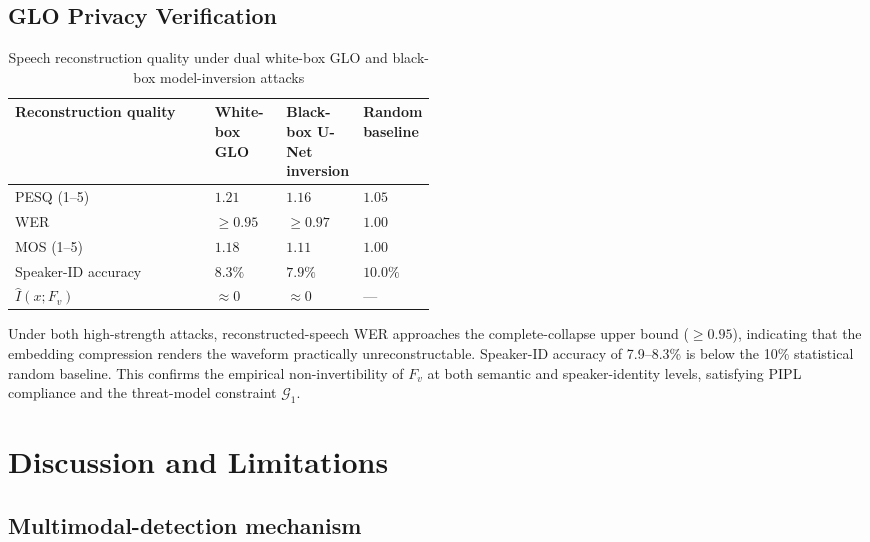 \documentclass[11pt, a4paper]{article}
\begin{document}
\subsection{GLO Privacy Verification}

\begin{table}[htbp]
\centering
\caption{Speech reconstruction quality under dual white-box GLO and black-box model-inversion attacks}
\label{tab:privacy_attack-en}
\small
\renewcommand{\arraystretch}{1.25}
\begin{tabular}{l>{\centering\arraybackslash}p{0.17\linewidth}>{\centering\arraybackslash}p{0.16\linewidth}>{\centering\arraybackslash}p{0.16\linewidth}}
\toprule
\textbf{Reconstruction quality} & \textbf{White-box GLO} & \textbf{Black-box U-Net inversion} & \textbf{Random baseline} \\
\midrule
PESQ (1--5) & $1.21$ & $1.16$ & $1.05$ \\
WER & $\ge 0.95$ & $\ge 0.97$ & $1.00$ \\
MOS (1--5) & $1.18$ & $1.11$ & $1.00$ \\
Speaker-ID accuracy & $8.3\%$ & $7.9\%$ & $10.0\%$ \\
$\hat{I}(x; F_v)$ & $\approx 0$ & $\approx 0$ & --- \\
\bottomrule
\end{tabular}
\end{table}

Under both high-strength attacks, reconstructed-speech WER approaches the complete-collapse upper bound ($\ge 0.95$), indicating that the embedding compression renders the waveform practically unreconstructable. Speaker-ID accuracy of 7.9--8.3\% is below the 10\% statistical random baseline. This confirms the empirical non-invertibility of $F_v$ at both semantic and speaker-identity levels, satisfying PIPL compliance and the threat-model constraint $\mathcal{G}_1$.

\section{Discussion and Limitations}

\subsection{Multimodal-detection mechanism}
\end{document}
